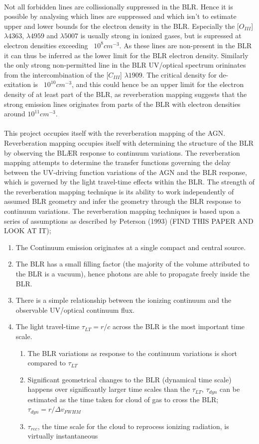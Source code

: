\documentclass[11pt]{article}
\begin{document}
\\
Not all forbidden lines are collissionally suppressed in the BLR. Hence it is possible by analysing which lines are suppressed and which isn't to estimate upper and lower bounds for the electron density in the BLR. Especially the [$O_{III}$] $\lambda 4363$, $\lambda 4959$ and $\lambda 5007$ is usually strong in ionized gases, but is supressed at electron densities exceeding ~$10^{8} cm^{-3}$. As these lines are non-present in the BLR it can thus be inferred as the lower limit for the BLR electron density. Similarly the only strong non-permitted line in the BLR UV/optical spectrum orininates from the intercombination of the [$C_{III}$] $\lambda 1909$. The critical density for de-exitation is ~$10^{10} cm^{-3}$, and this could hence be an upper limit for the electron density of at least part of the BLR, as reverberation mapping suggests that the strong emission lines originates from parts of the BLR with electron densities around $10^{11} cm^{-3}$. \\
\\
This project occupies itself with the reverberation mapping of the AGN. Reverberation mapping occupies itself with determining the structure of the BLR by observing the BLÆR response to continuum variations. The reverberation mapping attempts to determine the transfer functions governing the delay between the UV-driving function variations of the AGN and the BLR response, which is governed by the light travel-time effects within the BLR. The strength of the reverberation mapping technique is its ability to work independently of assumed BLR geometry and infer the geometry through the BLR response to continuum variations. The reverberation mapping techniques is based upon a series of assumptions as described by Peterson (1993) (FIND THIS PAPER AND LOOK AT IT);
\begin{enumerate}
\item The Continuum emission originates at a single compact and central source.
\item The BLR has a small filling factor (the majority of the volume attributed to the BLR is a vacuum), hence photons are able to propagate freely inside the BLR.
\item There is a simple relationship between the ionizing continuum and the observable UV/optical continuum flux.
\item The light travel-time $\tau_{LT}=r/c$ across the BLR is the most important time scale. 
\begin{enumerate}
\item The BLR variations as response to the continuum variations is short compared to $\tau_{LT}$
\item Significant geometrical changes to the BLR (dynamical time scale) happens over significantly larger time scales than the $\tau_{LT}$, $\tau_{dyn}$ can be estimated as the time taken for cloud of gas to cross the BLR; $\tau_{dyn} = r/\Delta v_{FWHM}$
\item $\tau_{rec}$, the time scale for the cloud to reprocess ionizing radiation, is virtually instantaneous
\end{enumerate}
\end{enumerate}
\end{document}
